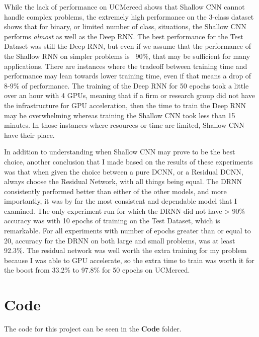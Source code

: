 \documentclass[12pt]{article}
\begin{document}
	While the lack of performance on UCMerced shows that Shallow CNN cannot handle complex problems, the extremely high performance on the 3-class dataset shows that for binary, or limited number of class, situations, the Shallow CNN performs \textit{almost} as well as the Deep RNN. The best performance for the Test Dataset was still the Deep RNN, but even if we assume that the performance of the Shallow RNN on simpler problems is ~90\%, that may be sufficient for many applications. There are instances where the tradeoff between training time and performance may lean towards lower training time, even if that means a drop of 8-9\% of performance. The training of the Deep RNN for 50 epochs took a little over an hour with 4 GPUs, meaning that if a firm or research group did not have the infrastructure for GPU acceleration, then the time to train the Deep RNN may be overwhelming whereas training the Shallow CNN took less than 15 minutes. In those instances where resources or time are limited, Shallow CNN have their place. 
	
	In addition to understanding when Shallow CNN may prove to be the best choice, another conclusion that I made based on the results of these experiments was that when given the choice between a pure DCNN, or a Residual DCNN, always choose the Residual Network, with all things being equal. The DRNN consistently performed better than either of the other models, and more importantly, it was by far the most consistent and dependable model that I examined. The only experiment run for which the DRNN did not have > 90\% accuracy was with 10 epochs of training on the Test Dataset, which is remarkable. For all experiments with number of epochs greater than or equal to 20, accuracy for the DRNN on both large and small problems, was at least 92.3\%. The residual network was well worth the extra training for my problem because I was able to GPU accelerate, so the extra time to train was worth it for the boost from 33.2\% to 97.8\% for 50 epochs on UCMerced. 
	
	


	
	\section{Code}
	
	The code for this project can be seen in the \textbf{Code} folder. 
	
	
	\newpage
	 
	
\end{document}
